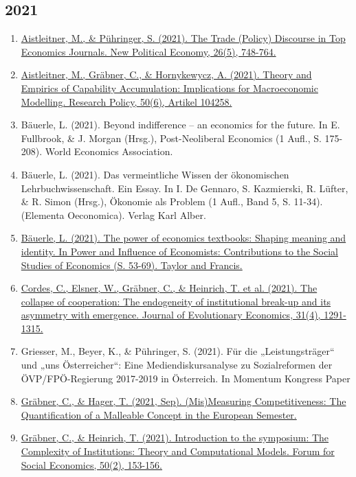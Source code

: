 \subsection*{2021}
\begin{enumerate}
	 \item \href{https://doi.org/10.1080/13563467.2020.1841145}{Aistleitner, M., \& Pühringer, S. (2021). The Trade (Policy) Discourse in Top Economics Journals. New Political Economy, 26(5), 748-764.}
	 \item \href{https://doi.org/10.1016/j.respol.2021.104258}{Aistleitner, M., Gräbner, C., \& Hornykewycz, A. (2021). Theory and Empirics of Capability Accumulation: Implications for Macroeconomic Modelling. Research Policy, 50(6), Artikel 104258.}
	 \item Bäuerle, L. (2021). Beyond indifference – an economics for the future. In E. Fullbrook, \& J. Morgan (Hrsg.), Post-Neoliberal Economics (1 Aufl., S. 175-208). World Economics Association.
	 \item Bäuerle, L. (2021). Das vermeintliche Wissen der ökonomischen Lehrbuchwissenschaft. Ein Essay. In I. De Gennaro, S. Kazmierski, R. Lüfter, \& R. Simon (Hrsg.), Ökonomie als Problem (1 Aufl., Band 5, S. 11-34). (Elementa Oeconomica). Verlag Karl Alber.
	 \item \href{https://doi.org/10.4324/9780367817084-5}{Bäuerle, L. (2021). The power of economics textbooks: Shaping meaning and identity. In Power and Influence of Economists: Contributions to the Social Studies of Economics (S. 53-69). Taylor and Francis.}
	 \item \href{https://doi.org/10.1007/s00191-021-00739-2}{Cordes, C., Elsner, W., Gräbner, C., \& Heinrich, T. et al. (2021). The collapse of cooperation: The endogeneity of institutional break-up and its asymmetry with emergence. Journal of Evolutionary Economics, 31(4), 1291-1315.}
	 \item Griesser, M., Beyer, K., \& Pühringer, S. (2021). Für die „Leistungsträger“ und „uns Österreicher“: Eine Mediendiskursanalyse zu Sozialreformen der ÖVP/FPÖ-Regierung 2017-2019 in Österreich. In Momentum Kongress Paper
	 \item \href{https://www.econstor.eu/handle/10419/242980}{Gräbner, C., \& Hager, T. (2021, Sep). (Mis)Measuring Competitiveness: The Quantification of a Malleable Concept in the European Semester.}
	 \item \href{https://doi.org/10.1080/07360932.2020.1752765}{Gräbner, C., \& Heinrich, T. (2021). Introduction to the symposium: The Complexity of Institutions: Theory and Computational Models. Forum for Social Economics, 50(2), 153-156.}

\end{enumerate}
